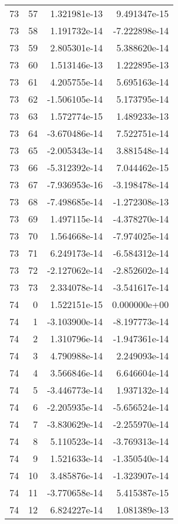 \begin{tabular}{rrrr}
  73 &   57 &  1.321981e-13 &  9.491347e-15 \\
  73 &   58 &  1.191732e-14 & -7.222898e-14 \\
  73 &   59 &  2.805301e-14 &  5.388620e-14 \\
  73 &   60 &  1.513146e-13 &  1.222895e-13 \\
  73 &   61 &  4.205755e-14 &  5.695163e-14 \\
  73 &   62 & -1.506105e-14 &  5.173795e-14 \\
  73 &   63 &  1.572774e-15 &  1.489233e-13 \\
  73 &   64 & -3.670486e-14 &  7.522751e-14 \\
  73 &   65 & -2.005343e-14 &  3.881548e-14 \\
  73 &   66 & -5.312392e-14 &  7.044462e-15 \\
  73 &   67 & -7.936953e-16 & -3.198478e-14 \\
  73 &   68 & -7.498685e-14 & -1.272308e-13 \\
  73 &   69 &  1.497115e-14 & -4.378270e-14 \\
  73 &   70 &  1.564668e-14 & -7.974025e-14 \\
  73 &   71 &  6.249173e-14 & -6.584312e-14 \\
  73 &   72 & -2.127062e-14 & -2.852602e-14 \\
  73 &   73 &  2.334078e-14 & -3.541617e-14 \\
  74 &    0 &  1.522151e-15 &  0.000000e+00 \\
  74 &    1 & -3.103900e-14 & -8.197773e-14 \\
  74 &    2 &  1.310796e-14 & -1.947361e-14 \\
  74 &    3 &  4.790988e-14 &  2.249093e-14 \\
  74 &    4 &  3.566846e-14 &  6.646604e-14 \\
  74 &    5 & -3.446773e-14 &  1.937132e-14 \\
  74 &    6 & -2.205935e-14 & -5.656524e-14 \\
  74 &    7 & -3.830629e-14 & -2.255970e-14 \\
  74 &    8 &  5.110523e-14 & -3.769313e-14 \\
  74 &    9 &  1.521633e-14 & -1.350540e-14 \\
  74 &   10 &  3.485876e-14 & -1.323907e-14 \\
  74 &   11 & -3.770658e-14 &  5.415387e-15 \\
  74 &   12 &  6.824227e-14 &  1.081389e-13 \\

\end{tabular}
